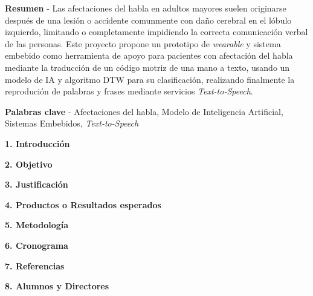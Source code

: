 \documentclass[10.5pt]{report}
\begin{document}


\hfill\break
\justifying
\textbf{Resumen} - Las afectaciones del habla en adultos mayores suelen originarse después de una lesión o accidente comunmente con daño cerebral en el lóbulo izquierdo, limitando o completamente impidiendo la correcta comunicación verbal de las personas. Este proyecto propone un prototipo de \textit{wearable} y sistema embebido como herramienta de apoyo para pacientes con afectación del habla mediante la traducción de un código motriz de una mano a texto, usando un modelo de IA y algoritmo DTW para su clasificación, realizando finalmente la reprodución de palabras y frases mediante servicios \textit{Text-to-Speech}.

\hfill \break
\textbf{Palabras clave} - Afectaciones del habla, Modelo de Inteligencia Artificial, Sistemas Embebidos, \textit{Text-to-Speech}

\hfill \break
{\fontsize{12}{14}\textbf{1. Introducción}}
\hfill \break


\hfill \break
{\fontsize{12}{14}\textbf{2. Objetivo}}
\hfill \break
\justifying


\hfill \break
{\fontsize{12}{14}\textbf{3. Justificación}}
\hfill \break
\justifying


\hfill \break
{\fontsize{12}{14}\textbf{4. Productos o Resultados esperados}}
\hfill \break
\justifying


\hfill \break
{\fontsize{12}{14}\textbf{5. Metodología}}
\hfill \break
\justifying


\newpage
\hfill \break
{\fontsize{12}{14}\textbf{6. Cronograma}}
\hfill \break
\justifying


\newpage
\hfill \break
{\fontsize{12}{14}\textbf{7. Referencias}}

\hfill \break


\newpage

{\fontsize{12}{14}\textbf{8. Alumnos y Directores}}


\end{document}
